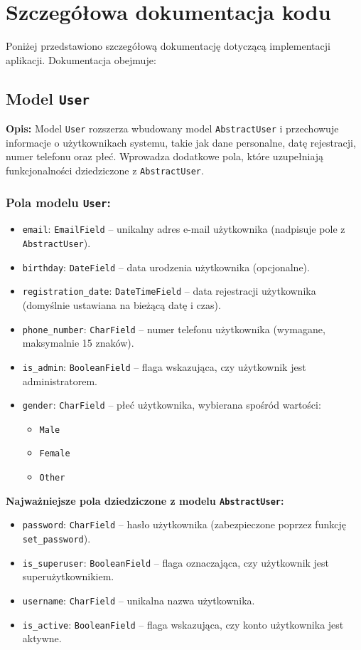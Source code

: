 \documentclass[12pt,a4paper,oneside]{article}
\theoremstyle{definition}
\numberwithin{equation}{section}
\begin{document}
\clearpage

\section{Szczegółowa dokumentacja kodu}
Poniżej przedstawiono szczegółową dokumentację dotyczącą implementacji aplikacji. Dokumentacja obejmuje:
% 
% 
\subsection{Model \texttt{User}}
\textbf{Opis:} 
Model \texttt{User} rozszerza wbudowany model \texttt{AbstractUser} i przechowuje informacje o użytkownikach systemu, takie jak dane personalne, datę rejestracji, numer telefonu oraz płeć. Wprowadza dodatkowe pola, które uzupełniają funkcjonalności dziedziczone z \texttt{AbstractUser}.

\subsubsection{Pola modelu \texttt{User}:}
\begin{itemize}
    \item \texttt{email}: \texttt{EmailField} – unikalny adres e-mail użytkownika (nadpisuje pole z \texttt{AbstractUser}).
    \item \texttt{birthday}: \texttt{DateField} – data urodzenia użytkownika (opcjonalne).
    \item \texttt{registration\_date}: \texttt{DateTimeField} – data rejestracji użytkownika (domyślnie ustawiana na bieżącą datę i czas).
    \item \texttt{phone\_number}: \texttt{CharField} – numer telefonu użytkownika (wymagane, maksymalnie 15 znaków).
    \item \texttt{is\_admin}: \texttt{BooleanField} – flaga wskazująca, czy użytkownik jest administratorem.
    \item \texttt{gender}: \texttt{CharField} – płeć użytkownika, wybierana spośród wartości:
    \begin{itemize}
        \item \texttt{Male}
        \item \texttt{Female}
        \item \texttt{Other}
    \end{itemize}
\end{itemize}

\textbf{Najważniejsze pola dziedziczone z modelu \texttt{AbstractUser}:}
\begin{itemize}
    \item \texttt{password}: \texttt{CharField} – hasło użytkownika (zabezpieczone poprzez funkcję \texttt{set\_password}).
    \item \texttt{is\_superuser}: \texttt{BooleanField} – flaga oznaczająca, czy użytkownik jest superużytkownikiem.
    \item \texttt{username}: \texttt{CharField} – unikalna nazwa użytkownika.
    \item \texttt{is\_active}: \texttt{BooleanField} – flaga wskazująca, czy konto użytkownika jest aktywne.
\end{itemize}
\end{document}
